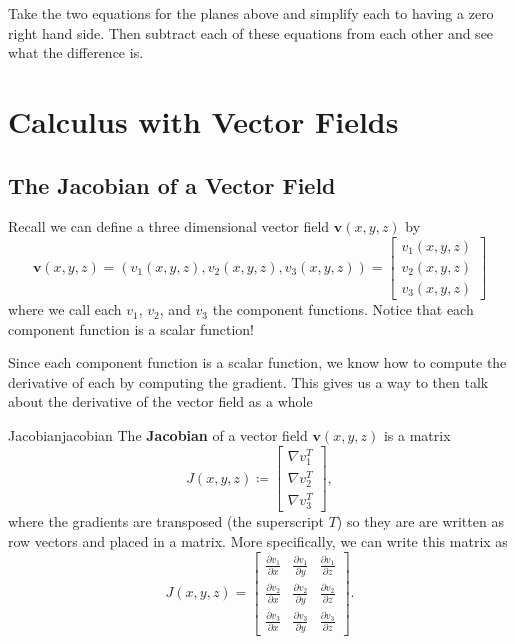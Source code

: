         \begin{exercise}
        Take the two equations for the planes above and simplify each to having a zero right hand side.  Then subtract each of these equations from each other and see what the difference is.
        \end{exercise}
        
        
    \chapter{Calculus with Vector Fields}
        \section{The Jacobian of a Vector Field}
        Recall we can define a three dimensional vector field $\mathbf{v}(x,y,z)$ by
        \[
        \mathbf{v}(x,y,z)=(v_1(x,y,z),v_2(x,y,z),v_3(x,y,z)) = \begin{bmatrix} v_1(x,y,z) \\ v_2(x,y,z) \\ v_3(x,y,z) \end{bmatrix}
        \]
        where we call each $v_1$, $v_2$, and $v_3$ the component functions.  Notice that each component function is a scalar function!
        
        Since each component function is a scalar function, we know how to compute the derivative of each by computing the gradient.  This gives us a way to then talk about the derivative of the vector field as a whole
        
        \begin{df}{Jacobian}{jacobian}
        The \textbf{Jacobian} of a vector field $\mathbf{v}(x,y,z)$ is a matrix
        \[
        J(x,y,z)\coloneqq \begin{bmatrix} \nabla v_1^T \\ \nabla v_2^T \\ \nabla v_3^T \end{bmatrix},
        \]
        where the gradients are transposed (the superscript $T$) so they are are written as row vectors and placed in a matrix. More specifically, we can write this matrix as 
        \[
        J(x,y,z) = \begin{bmatrix} \frac{\partial v_1}{\partial x} & \frac{\partial v_1}{\partial y} & \frac{\partial v_1}{\partial z}\\ \frac{\partial v_2}{\partial x} & \frac{\partial v_2}{\partial y} & \frac{\partial v_2}{\partial z} \\ \frac{\partial v_3}{\partial x} & \frac{\partial v_3}{\partial y} & \frac{\partial v_3}{\partial z} \end{bmatrix}.
        \]
        \end{df}
        
